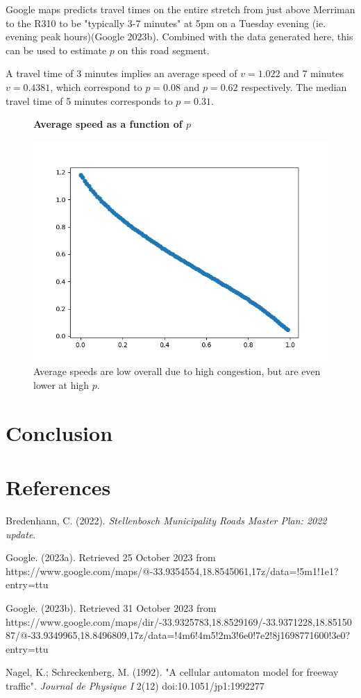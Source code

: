 \documentclass{article}
\begin{document}
Google maps predicts travel times on the entire stretch from just above Merriman to the R310 to be "typically 3-7 minutes" at 5pm on a Tuesday evening (ie. evening peak hours)(Google 2023b). Combined with the data generated here, this can be used to estimate $p$ on this road segment.

A travel time of 3 minutes implies an average speed of $v=1.022$ and 7 minutes $v=0.4381$, which correspond to $p=0.08$ and $p=0.62$ respectively. The median travel time of 5 minutes corresponds to $p=0.31$.

\begin{figure}
\textbf{\large Average speed as a function of $p$}\par\medskip
{}
\includegraphics[scale = 0.55, left]{./data/phase2/v_vs_p.png}
\vspace*{0.1cm}\hspace*{4.5cm}{\large $p$}
\caption{\label{fig} Average speeds are low overall due to high congestion, but are even lower at high $p$.}
\end{figure}

\section*{Conclusion}

\section*{References}


Bredenhann, C. (2022). \textit{Stellenbosch Municipality Roads Master Plan: 2022 update}.

Google. (2023a). Retrieved 25 October 2023 from https://www.google.com/maps/@-33.9354554,18.8545061,17z/data=!5m1!1e1?entry=ttu

Google. (2023b). Retrieved 31 October 2023 from https://www.google.com/maps/dir/-33.9325783,18.8529169/-33.9371228,18.8515087/@-33.9349965,18.8496809,17z/data=!4m6!4m5!2m3!6e0!7e2!8j1698771600!3e0?entry=ttu

Nagel, K.; Schreckenberg, M. (1992). "A cellular automaton model for freeway traffic". \textit{Journal de Physique I} 2(12) doi:10.1051/jp1:1992277
\end{document}
